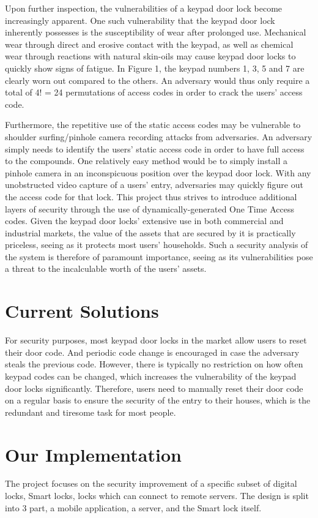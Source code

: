 \documentclass[conference]{IEEEtran}
\begin{document}
	Upon further inspection, the vulnerabilities of a keypad door lock become increasingly apparent.
One such vulnerability that the keypad door lock inherently possesses is  the susceptibility of wear after prolonged use. Mechanical wear through direct and erosive contact with the keypad, as well as chemical wear through reactions with natural skin-oils may cause keypad door locks to quickly show signs of fatigue. In Figure 1, the keypad numbers 1, 3, 5 and 7 are clearly worn out compared to the others. An adversary would thus only require a total of 4! = 24 permutations of access codes in order to crack the users’ access code.

	Furthermore, the repetitive use of the static access codes may be vulnerable to shoulder surfing/pinhole camera recording attacks from adversaries. An adversary simply needs to identify the users’ static access code in order to have full access to the compounds. One relatively easy method would be to simply install a pinhole camera in an inconspicuous position over the keypad door lock. With any unobstructed video capture of a users’ entry, adversaries may quickly figure out the access code for that lock.
This project thus strives to introduce additional layers of security through the use of dynamically-generated One Time Access codes. Given the keypad door locks’ extensive use in both commercial and industrial markets, the value of the assets that are secured by it is practically priceless, seeing as it protects most users’ households. Such a security analysis of the system is therefore of paramount importance, seeing as its vulnerabilities pose a threat to the incalculable worth of the users’ assets.

\section{Current Solutions}
	For security purposes, most keypad door locks in the market allow users to reset their door code. And periodic code change is encouraged in case the adversary steals the previous code. However, there is typically no restriction on how often keypad codes can be changed, which increases the vulnerability of the keypad door locks significantly.
Therefore, users need to manually reset their door code on a regular basis to ensure the security of the entry to their houses, which is the redundant and tiresome task for most people.

\section{Our Implementation}
	The project focuses on the security improvement of a specific subset of digital locks, Smart locks, locks which can connect to remote servers. The design is split into 3 part, a mobile application, a server, and the Smart lock itself.
\end{document}
